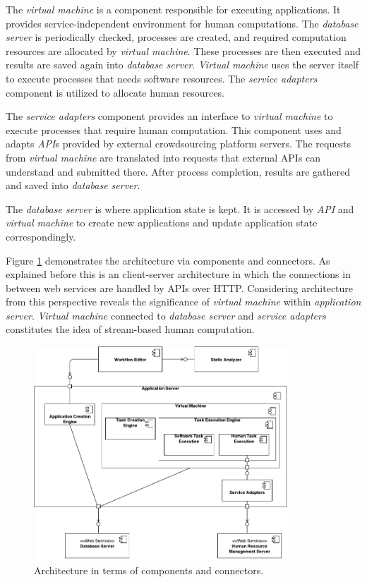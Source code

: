 The \textit{virtual machine} is a component responsible for executing applications. 
It provides service-independent environment for human computations. The 
\textit{database server} is periodically checked, processes are created, and 
required computation resources are allocated by \textit{virtual machine}. These 
processes are then executed and results are saved again into \textit{database server}. 
\textit{Virtual machine} uses the server itself to execute processes that needs 
software resources. The \textit{service adapters} component is utilized to allocate 
human resources.

The \textit{service adapters} component provides an interface to \textit{virtual machine} 
to execute processes that require human computation. This component uses and 
adapts \textit{API}s provided by external crowdsourcing platform servers. The requests 
from \textit{virtual machine} are translated into requests that external APIs can 
understand and submitted there. After process completion, results are gathered and 
saved into \textit{database server}.

The \textit{database server} is where application state is kept. It is accessed by 
\textit{API} and \textit{virtual machine} to create new applications and update 
application state correspondingly.

Figure \ref{fig:componentconnector} demonstrates the architecture via components 
and connectors. As explained before this is an client-server architecture in which 
the connections in between web services are handled by APIs over HTTP. 
Considering architecture from this perspective reveals the significance of 
\textit{virtual machine} within \textit{application server}. \textit{Virtual machine} 
connected to \textit{database server} and \textit{service adapters} constitutes 
the idea of stream-based human computation.

\begin{figure}[ht]
	\centering
	\includegraphics[width=0.85\textwidth]{figures/architecture/ComponentConnector.pdf}
	\caption{Architecture in terms of components and connectors.}
	\label{fig:componentconnector}
\end{figure}

